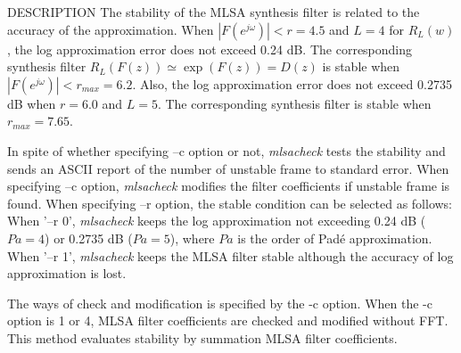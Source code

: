 \begin{qsection}{DESCRIPTION}
 The stability of the MLSA synthesis filter
 is related to the accuracy of the approximation.
 When \begin{math} |F(e^{j\omega})| < r = 4.5 \end{math} and
 \begin{math} L = 4 \end{math}
 for \begin{math} R_{L}(w)\end{math},
 the log approximation error does not exceed 0.24 dB.
 The corresponding synthesis filter
 \begin{math} R_{L}(F(z))\simeq \exp(F(z))=D(z)\end{math}
 is stable when \begin{math} |F(e^{j\omega})| < r_{max} = 6.2 \end{math}.
 Also, the log approximation error does not exceed 0.2735 dB
 when \begin{math} r = 6.0 \end{math} and
 \begin{math}L = 5 \end{math}.
 The corresponding synthesis filter is stable
 when \begin{math}r_{max} = 7.65 \end{math}.

 In spite of whether specifying --c option or not,
 {\em mlsacheck} tests the stability and sends
 an ASCII report of the number of unstable frame to standard error.
 When specifying --c option,
 {\em mlsacheck} modifies the filter coefficients
 if unstable frame is found.
 When specifying --r option,
 the stable condition can be selected as follows:
 When '--r 0', {\em mlsacheck} keeps the log approximation
 not exceeding 0.24 dB ($Pa=4$) or 0.2735 dB ($Pa=5$),
 where $Pa$ is the order of Pad\'e approximation.
 When '--r 1', {\em mlsacheck} keeps the MLSA filter stable
 although the accuracy of log approximation is lost.

 The ways of check and modification is specified by the -c option.
 When the -c option is 1 or 4, MLSA filter coefficients are checked and modified without FFT.
 This method evaluates stability by summation MLSA filter coefficients.
\end{qsection}

